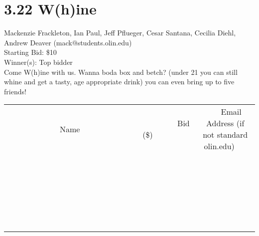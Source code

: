 \documentclass[11pt]{article}
\begin{document}
\section*{3.22 W(h)ine}
Mackenzie Frackleton, Ian Paul, Jeff Pflueger, Cesar Santana, Cecilia Diehl, Andrew Deaver (mack@students.olin.edu) \\
Starting Bid: \$10 \\
Winner(s): 
Top bidder \\
Come W(h)ine with us. Wanna boda box and betch? (under 21 you can still whine and get a tasty, age appropriate drink) you can even bring up to five friends! \\[6ex]
\begin{tabular}{c c c}
~~~~~~~~~~~~~Name~~~~~~~~~~~~~ & ~~~~~~~~~Bid (\$)~~~~~~~~~ & ~~~Email Address (if not standard olin.edu)~~~ \\
 & & \\
\hline
 & & \\
\hline
 & & \\
\hline
 & & \\
\hline
 & & \\
\hline
 & & \\
\hline
 & & \\
\hline
 & & \\
\hline
 & & \\
\hline
 & & \\
\hline
 & & \\
\hline
 & & \\
\hline
 & & \\
\hline
 & & \\
\hline
 & & \\
\hline
 & & \\
\hline
 & & \\
\hline
 & & \\
\hline
 & & \\
\hline
 & & \\
\hline
 & & \\
\hline
 & & \\
\hline
 & & \\
\hline
 & & \\
\hline
 & & \\
\hline
 & & \\
\hline
\end{tabular}
\clearpage
\end{document}
